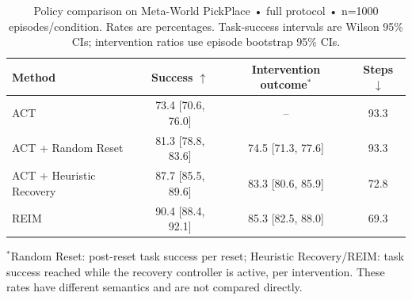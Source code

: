 \begin{table}[t]
\centering
\small
\caption{Policy comparison on Meta-World PickPlace • full protocol • n=1000 episodes/condition. Rates are percentages. Task-success intervals are Wilson 95\% CIs; intervention ratios use episode bootstrap 95\% CIs.}
\label{tab:baseline}
\begin{tabular}{lccc}
\toprule
Method & Success $\uparrow$ & Intervention outcome$^\ast$ & Steps $\downarrow$ \\
\midrule
ACT & 73.4 [70.6, 76.0] & -- & 93.3 \\
ACT + Random Reset & 81.3 [78.8, 83.6] & 74.5 [71.3, 77.6] & 93.3 \\
ACT + Heuristic Recovery & 87.7 [85.5, 89.6] & 83.3 [80.6, 85.9] & 72.8 \\
REIM & 90.4 [88.4, 92.1] & 85.3 [82.5, 88.0] & 69.3 \\
\bottomrule
\end{tabular}
\vspace{1mm}\parbox{0.98\linewidth}{\footnotesize $^\ast$Random Reset: post-reset task success per reset; Heuristic Recovery/REIM: task success reached while the recovery controller is active, per intervention. These rates have different semantics and are not compared directly.}
\end{table}
